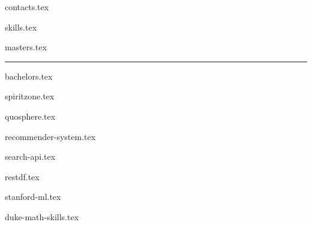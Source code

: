\documentclass[11pt]{article}
\begin{document}
{contacts.tex}



{skills.tex}



{masters.tex}

\par\noindent\rule{\textwidth}{0.4pt}

{bachelors.tex}



{spiritzone.tex}

{quosphere.tex}



{recommender-system.tex}

{search-api.tex}

{restdf.tex}



{stanford-ml.tex}

{duke-math-skills.tex}
\end{document}
